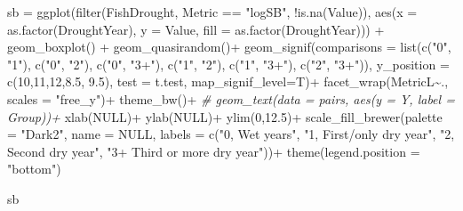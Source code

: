 \documentclass[
]{article}
\newenvironment{Shaded}{\begin{snugshade}}{\end{snugshade}}
\newcommand{\AttributeTok}[1]{\textcolor[rgb]{0.77,0.63,0.00}{#1}}
\newcommand{\CommentTok}[1]{\textcolor[rgb]{0.56,0.35,0.01}{\textit{#1}}}
\newcommand{\ConstantTok}[1]{\textcolor[rgb]{0.00,0.00,0.00}{#1}}
\newcommand{\DecValTok}[1]{\textcolor[rgb]{0.00,0.00,0.81}{#1}}
\newcommand{\FloatTok}[1]{\textcolor[rgb]{0.00,0.00,0.81}{#1}}
\newcommand{\FunctionTok}[1]{\textcolor[rgb]{0.00,0.00,0.00}{#1}}
\newcommand{\NormalTok}[1]{#1}
\newcommand{\OtherTok}[1]{\textcolor[rgb]{0.56,0.35,0.01}{#1}}
\newcommand{\SpecialCharTok}[1]{\textcolor[rgb]{0.00,0.00,0.00}{#1}}
\newcommand{\StringTok}[1]{\textcolor[rgb]{0.31,0.60,0.02}{#1}}
\begin{document}
\begin{Shaded}
\begin{Highlighting}[]
\NormalTok{  sb }\OtherTok{=} \FunctionTok{ggplot}\NormalTok{(}\FunctionTok{filter}\NormalTok{(FishDrought, Metric }\SpecialCharTok{==} \StringTok{"logSB"}\NormalTok{, }\SpecialCharTok{!}\FunctionTok{is.na}\NormalTok{(Value)),  }\FunctionTok{aes}\NormalTok{(}\AttributeTok{x =} \FunctionTok{as.factor}\NormalTok{(DroughtYear), }\AttributeTok{y =}\NormalTok{ Value, }\AttributeTok{fill =} \FunctionTok{as.factor}\NormalTok{(DroughtYear))) }\SpecialCharTok{+} 
  \FunctionTok{geom\_boxplot}\NormalTok{() }\SpecialCharTok{+}
  \FunctionTok{geom\_quasirandom}\NormalTok{()}\SpecialCharTok{+}
  \FunctionTok{geom\_signif}\NormalTok{(}\AttributeTok{comparisons =} \FunctionTok{list}\NormalTok{(}\FunctionTok{c}\NormalTok{(}\StringTok{"0"}\NormalTok{, }\StringTok{"1"}\NormalTok{), }\FunctionTok{c}\NormalTok{(}\StringTok{"0"}\NormalTok{, }\StringTok{"2"}\NormalTok{), }\FunctionTok{c}\NormalTok{(}\StringTok{"0"}\NormalTok{, }\StringTok{"3+"}\NormalTok{), }
                                 \FunctionTok{c}\NormalTok{(}\StringTok{"1"}\NormalTok{, }\StringTok{"2"}\NormalTok{), }\FunctionTok{c}\NormalTok{(}\StringTok{"1"}\NormalTok{, }\StringTok{"3+"}\NormalTok{), }\FunctionTok{c}\NormalTok{(}\StringTok{"2"}\NormalTok{, }\StringTok{"3+"}\NormalTok{)), }
              \AttributeTok{y\_position =} \FunctionTok{c}\NormalTok{(}\DecValTok{10}\NormalTok{,}\DecValTok{11}\NormalTok{,}\DecValTok{12}\NormalTok{,}\FloatTok{8.5}\NormalTok{, }\FloatTok{9.5}\NormalTok{), }\AttributeTok{test =}\NormalTok{ t.test, }
              \AttributeTok{map\_signif\_level=}\NormalTok{T)}\SpecialCharTok{+}
  \FunctionTok{facet\_wrap}\NormalTok{(MetricL}\SpecialCharTok{\textasciitilde{}}\NormalTok{., }\AttributeTok{scales =} \StringTok{"free\_y"}\NormalTok{)}\SpecialCharTok{+} \FunctionTok{theme\_bw}\NormalTok{()}\SpecialCharTok{+}
 \CommentTok{\# geom\_text(data = pairs, aes(y = Y, label = Group))+}
  \FunctionTok{xlab}\NormalTok{(}\ConstantTok{NULL}\NormalTok{)}\SpecialCharTok{+} \FunctionTok{ylab}\NormalTok{(}\ConstantTok{NULL}\NormalTok{)}\SpecialCharTok{+} \FunctionTok{ylim}\NormalTok{(}\DecValTok{0}\NormalTok{,}\FloatTok{12.5}\NormalTok{)}\SpecialCharTok{+}
  \FunctionTok{scale\_fill\_brewer}\NormalTok{(}\AttributeTok{palette =} \StringTok{"Dark2"}\NormalTok{, }\AttributeTok{name =} \ConstantTok{NULL}\NormalTok{, }\AttributeTok{labels =} \FunctionTok{c}\NormalTok{(}\StringTok{"0, Wet years"}\NormalTok{, }\StringTok{"1, First/only dry year"}\NormalTok{,}
                                                                            \StringTok{"2, Second dry year"}\NormalTok{, }\StringTok{"3+ Third or more dry year"}\NormalTok{))}\SpecialCharTok{+}
    \FunctionTok{theme}\NormalTok{(}\AttributeTok{legend.position =} \StringTok{"bottom"}\NormalTok{)}

\NormalTok{  sb}
\end{Highlighting}
\end{Shaded}
\end{document}
